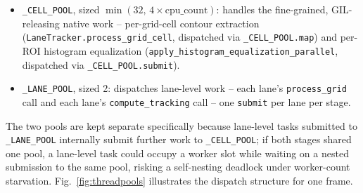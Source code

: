 \documentclass[conference]{IEEEtran}
\newcommand{\code}[1]{\texttt{#1}}
\begin{document}
\begin{itemize}
\item \code{\_CELL\_POOL}, sized $\min(32,\,4\times\text{cpu\_count})$:
handles the fine-grained, GIL-releasing native work -- per-grid-cell
contour extraction (\code{LaneTracker.process\_grid\_cell}, dispatched
via \code{\_CELL\_POOL.map}) and per-ROI histogram equalization
(\code{apply\_histogram\_equalization\_parallel}, dispatched via
\code{\_CELL\_POOL.submit}).
\item \code{\_LANE\_POOL}, sized 2: dispatches lane-level work -- each
lane's \code{process\_grid} call and each lane's
\code{compute\_tracking} call -- one \code{submit} per lane per stage.
\end{itemize}

The two pools are kept separate specifically because lane-level tasks
submitted to \code{\_LANE\_POOL} internally submit further work to
\code{\_CELL\_POOL}; if both stages shared one pool, a lane-level task
could occupy a worker slot while waiting on a nested submission to the
same pool, risking a self-nesting deadlock under worker-count
starvation. Fig.~\ref{fig:threadpools} illustrates the dispatch
structure for one frame.
\end{document}
